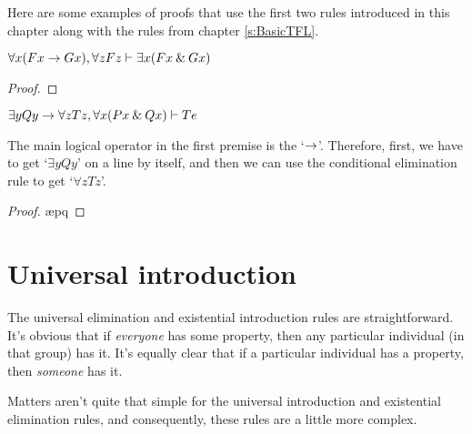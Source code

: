 Here are some examples of proofs that use the first two rules introduced in this chapter along with the rules from chapter \ref{s:BasicTFL}.
\bigskip

\begin{earg}

\noindent\begin{minipage}{0.99\textwidth}
\item $\forall x(Fx \rightarrow Gx), \forall zFz \vdash \exists x(Fx \mathbin{\&} Gx)$

\begin{proof}
	 \pr{}
	 \pr{}
	 
	 
	 
	 
	 	
\end{proof}
\bigskip
\end{minipage}

\item $ \exists yQy \rightarrow \forall zTz, \forall x(Px \mathbin{\&} Qx) \vdash Te$
\medskip

\noindent The main logical operator in the first premise is  the `$\rightarrow$'. Therefore, first, we have to get `$\exists yQy$' on a line by itself, and then we can use the conditional elimination rule to get `$\forall zTz$'. 

\begin{proof}
	 \pr{}
	 \pr{}
	 
	 \ae{pq}
	 
	 
	 
\end{proof}
\bigskip

\end{earg}


\section{Universal introduction}

The universal elimination and existential introduction rules are straightforward. It's obvious that if \textit{everyone} has some property, then any particular individual (in that group) has it. It's equally clear that if a particular individual has a property, then \textit{someone} has it.

Matters aren't quite that simple for the universal introduction and existential elimination rules, and consequently, these rules are a little more complex. 

